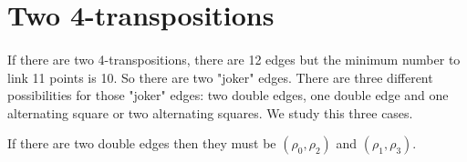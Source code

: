 \section{Two 4-transpositions}

\paragraph{}
If there are two 4-transpositions, there are 12 edges but the minimum number to link 11 points is 10. So there are two "joker" edges. There are three different possibilities for those "joker" edges: two double edges, one double edge and one alternating square or two alternating squares. We study this three cases.

\begin{lemma}
  If there are two double edges then they must be $(\rho_0, \rho_2)$ and $(\rho_1, \rho_3)$.
\end{lemma}


